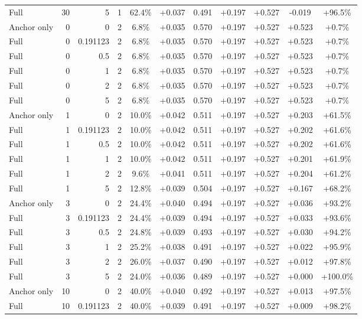 \begin{table}[htbp]
\begin{tabular}{lrrrccccccc}
Full & 30 & 5 & 1 & 62.4\% & +0.037 & 0.491 & +0.197 & +0.527 & -0.019 & +96.5\% \\
Anchor only & 0 & 0 & 2 & 6.8\% & +0.035 & 0.570 & +0.197 & +0.527 & +0.523 & +0.7\% \\
Full & 0 & 0.191123 & 2 & 6.8\% & +0.035 & 0.570 & +0.197 & +0.527 & +0.523 & +0.7\% \\
Full & 0 & 0.5 & 2 & 6.8\% & +0.035 & 0.570 & +0.197 & +0.527 & +0.523 & +0.7\% \\
Full & 0 & 1 & 2 & 6.8\% & +0.035 & 0.570 & +0.197 & +0.527 & +0.523 & +0.7\% \\
Full & 0 & 2 & 2 & 6.8\% & +0.035 & 0.570 & +0.197 & +0.527 & +0.523 & +0.7\% \\
Full & 0 & 5 & 2 & 6.8\% & +0.035 & 0.570 & +0.197 & +0.527 & +0.523 & +0.7\% \\
Anchor only & 1 & 0 & 2 & 10.0\% & +0.042 & 0.511 & +0.197 & +0.527 & +0.203 & +61.5\% \\
Full & 1 & 0.191123 & 2 & 10.0\% & +0.042 & 0.511 & +0.197 & +0.527 & +0.202 & +61.6\% \\
Full & 1 & 0.5 & 2 & 10.0\% & +0.042 & 0.511 & +0.197 & +0.527 & +0.202 & +61.6\% \\
Full & 1 & 1 & 2 & 10.0\% & +0.042 & 0.511 & +0.197 & +0.527 & +0.201 & +61.9\% \\
Full & 1 & 2 & 2 & 9.6\% & +0.041 & 0.511 & +0.197 & +0.527 & +0.204 & +61.2\% \\
Full & 1 & 5 & 2 & 12.8\% & +0.039 & 0.504 & +0.197 & +0.527 & +0.167 & +68.2\% \\
Anchor only & 3 & 0 & 2 & 24.4\% & +0.040 & 0.494 & +0.197 & +0.527 & +0.036 & +93.2\% \\
Full & 3 & 0.191123 & 2 & 24.4\% & +0.039 & 0.494 & +0.197 & +0.527 & +0.033 & +93.6\% \\
Full & 3 & 0.5 & 2 & 24.8\% & +0.039 & 0.493 & +0.197 & +0.527 & +0.030 & +94.2\% \\
Full & 3 & 1 & 2 & 25.2\% & +0.038 & 0.491 & +0.197 & +0.527 & +0.022 & +95.9\% \\
Full & 3 & 2 & 2 & 26.0\% & +0.037 & 0.490 & +0.197 & +0.527 & +0.012 & +97.8\% \\
Full & 3 & 5 & 2 & 24.0\% & +0.036 & 0.489 & +0.197 & +0.527 & +0.000 & +100.0\% \\
Anchor only & 10 & 0 & 2 & 40.0\% & +0.040 & 0.492 & +0.197 & +0.527 & +0.013 & +97.5\% \\
Full & 10 & 0.191123 & 2 & 40.0\% & +0.039 & 0.491 & +0.197 & +0.527 & +0.009 & +98.2\% \\

\end{tabular}
\end{table}
